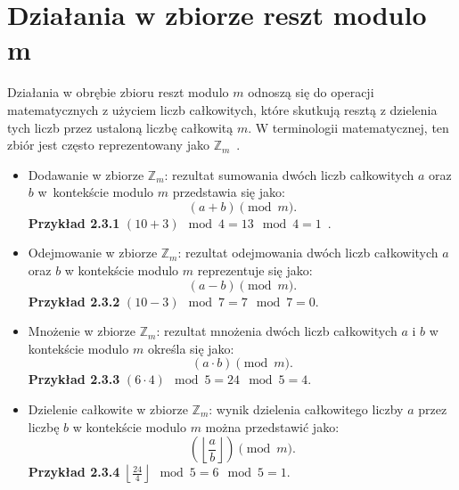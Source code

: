 \documentclass{SGGW-thesis}
\begin{document}
	\section{Działania w zbiorze reszt modulo m}
	Działania w obrębie zbioru reszt modulo \( m \) odnoszą się do operacji matematycznych z użyciem liczb całkowitych, które skutkują resztą z dzielenia tych liczb przez ustaloną liczbę całkowitą \( m \). W terminologii matematycznej, ten zbiór jest często reprezentowany jako \( \mathbb{Z}_m \)~\cite{ajakubiec}\cite{lewiszax}.
	\\
	\begin{itemize}
		\item Dodawanie w zbiorze \( \mathbb{Z}_m \): rezultat sumowania dwóch liczb całkowitych \( a \) oraz \( b \) w~kontekście modulo \( m \) przedstawia się jako:
		\begin{equation}
			(a + b) \pmod{m}.
		\end{equation}
		\textbf{Przykład 2.3.1} \( (10 + 3) \mod 4 = 13 \mod 4 = 1 \)~\cite{r23modulo}.
		\\
		\item Odejmowanie w zbiorze \( \mathbb{Z}_m \): rezultat odejmowania dwóch liczb całkowitych \( a \) oraz \( b \) w kontekście modulo \( m \) reprezentuje się jako:
		\begin{equation}
			(a - b) \pmod{m}.
		\end{equation}
		\textbf{Przykład 2.3.2} \( (10 - 3) \mod 7 = 7 \mod 7 = 0 \).
		\\
		\item Mnożenie w zbiorze \( \mathbb{Z}_m \): rezultat mnożenia dwóch liczb całkowitych \( a \) i \( b \) w kontekście modulo \( m \) określa się jako:
		\begin{equation}
			(a \cdot b) \pmod{m}.
		\end{equation}
		\textbf{Przykład 2.3.3} \( (6 \cdot 4) \mod 5 = 24 \mod 5 = 4 \).
		\\
		\item Dzielenie całkowite w zbiorze \( \mathbb{Z}_m \): wynik dzielenia całkowitego liczby \( a \) przez liczbę \( b \) w kontekście modulo \( m \) można przedstawić jako:
		\begin{equation}
			\left(\left\lfloor \frac{a}{b} \right\rfloor\right) \pmod{m}.
		\end{equation}
		\textbf{Przykład 2.3.4} \( \left\lfloor \frac{24}{4} \right\rfloor \mod 5 = 6 \mod 5 = 1. \)
	\end{itemize}
	\newpage
	
\end{document}
